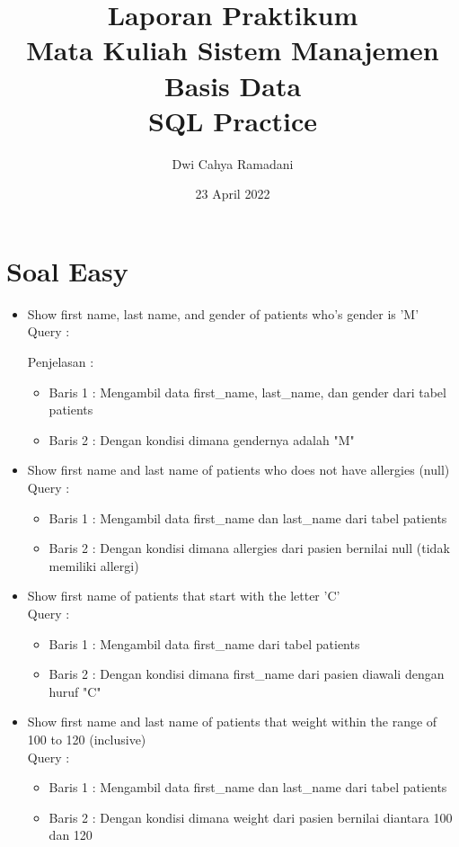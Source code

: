 \documentclass[]{article}
\title{Laporan Praktikum\\Mata Kuliah Sistem Manajemen Basis Data\\SQL Practice}
\author{Dwi Cahya Ramadani}
\date{23 April 2022}
\begin{document}
\maketitle

\section{Soal Easy}
    \begin{itemize}
        \item Show first name, last name, and gender of patients who's gender is 'M'
        \\Query : 
        
        Penjelasan :
        \begin{itemize}
            \item Baris 1 : Mengambil data first\_name, last\_name, dan gender dari tabel patients
            \item Baris 2 : Dengan kondisi dimana gendernya adalah "M"
        \end{itemize}

        \item Show first name and last name of patients who does not have allergies (null)
        \\Query :
        
        \begin{itemize}
            \item Baris 1 : Mengambil data first\_name dan last\_name dari tabel patients
            \item Baris 2 : Dengan kondisi dimana allergies dari pasien bernilai null (tidak memiliki allergi)
        \end{itemize}

        \item Show first name of patients that start with the letter 'C'
        \\Query :
        
        \begin{itemize}
            \item Baris 1 : Mengambil data first\_name dari tabel patients
            \item Baris 2 : Dengan kondisi dimana first\_name dari pasien diawali dengan huruf "C" 
        \end{itemize}

        \item Show first name and last name of patients that weight within the range of 100 to 120 (inclusive)
        \\Query :
        
        \begin{itemize}
            \item Baris 1 : Mengambil data first\_name dan last\_name dari tabel patients
            \item Baris 2 : Dengan kondisi dimana weight dari pasien bernilai diantara 100 dan 120
        \end{itemize}


\end{itemize}
\end{document}
